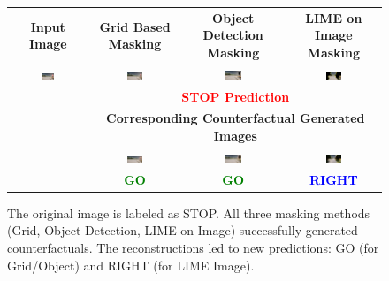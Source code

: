 \begin{figure}[htbp]
\centering
\begin{tabular}{c|ccc}
\textbf{Input Image} 
& \textbf{Grid Based Masking} 
& \textbf{Object Detection Masking} 
& \textbf{LIME on Image Masking} \\
\includegraphics[width=0.18\textwidth]{img/appendix/original_town7_000980.png}
& \includegraphics[width=0.18\textwidth]{img/appendix/grid_masked_town7_000980.png}
& \includegraphics[width=0.18\textwidth]{img/appendix/object_masked_town7_000980.png}
& \includegraphics[width=0.18\textwidth]{img/appendix/LIME_on_Image_maksed_town7_000980.png} \\
& \multicolumn{3}{c}{\textcolor{red}{\textbf{STOP Prediction}}} \\
& \multicolumn{3}{c}{\textbf{Corresponding Counterfactual Generated Images}} \\
& \includegraphics[width=0.18\textwidth]{img/appendix/grid_reconstructed_town7_000980.png}
& \includegraphics[width=0.18\textwidth]{img/appendix/object_reconstructed_town7_000980.png}
& \includegraphics[width=0.18\textwidth]{img/appendix/LIME_on_Image_reconstructed_town7_000980.png} \\
& \textcolor{green}{\textbf{GO}} 
& \textcolor{green}{\textbf{GO}} 
& \textcolor{blue}{\textbf{RIGHT}}
\end{tabular}

\caption{The original image is labeled as STOP. All three masking methods (Grid, Object Detection, LIME on Image) successfully generated counterfactuals. The reconstructions led to new predictions: GO (for Grid/Object) and RIGHT (for LIME Image).}
\label{fig:ce_grid_object_lime}
\end{figure}





